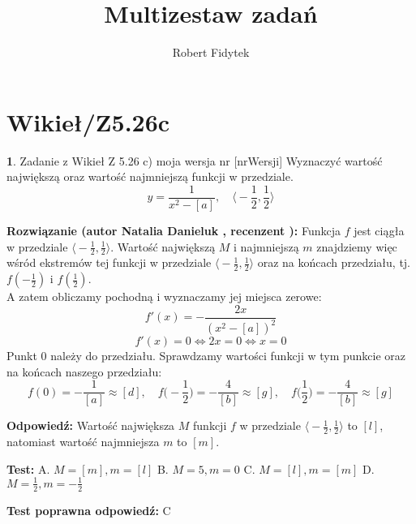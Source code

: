 \documentclass[12pt, a4paper]{article}
\title{Multizestaw zadań}
\author{Robert Fidytek}
\date{}
\theoremstyle{definition} %
\newtheorem{zad}{}
\newcommand{\kategoria}[1]{\section{#1}} %
\newcommand{\zadStart}[1]{\begin{zad}#1\newline} %
\newcommand{\zadStop}{\end{zad}}   %
\newcommand{\rozwStart}[2]{\noindent \textbf{Rozwiązanie (autor #1 , recenzent #2): }\newline} %
\newcommand{\rozwStop}{\newline}                                            %
\newcommand{\odpStart}{\noindent \textbf{Odpowiedź:}\newline}    %
\newcommand{\odpStop}{\newline}                                             %
\newcommand{\testStart}{\noindent \textbf{Test:}\newline} %
\newcommand{\testStop}{\newline} %
\newcommand{\kluczStart}{\noindent \textbf{Test poprawna odpowiedź:}\newline} %
\newcommand{\kluczStop}{\newline} %
\begin{document}
\maketitle

\kategoria{Wikieł/Z5.26c}

\zadStart{Zadanie z Wikieł Z 5.26 c) moja wersja nr [nrWersji]}
Wyznaczyć wartość największą oraz wartość najmniejszą funkcji w przedziale. 
$$y = \frac{1}{x^2-[a]}, \quad \big\langle-\frac{1}{2},\frac{1}{2}\big\rangle$$
\zadStop

\rozwStart{Natalia Danieluk}{}
Funkcja $f$ jest ciągła w przedziale $\big\langle-\frac{1}{2},\frac{1}{2}\big\rangle$. Wartość największą $M$ i najmniejszą $m$ znajdziemy więc wśród ekstremów tej funkcji w przedziale $\big\langle-\frac{1}{2},\frac{1}{2}\big\rangle$ oraz na końcach przedziału, tj. $f(-\frac{1}{2})$ i $f(\frac{1}{2})$. \\
A zatem obliczamy pochodną i wyznaczamy jej miejsca zerowe:
$$ f'(x) = -\frac{2 x}{(x^2-[a])^2} $$
$$ f'(x) = 0 \Leftrightarrow 2 x = 0 \Leftrightarrow x = 0 $$ 
Punkt $0$ należy do przedziału. Sprawdzamy wartości funkcji w tym punkcie oraz na końcach naszego przedziału: \\
$$ f(0) = -\frac{1}{[a]}\approx [d],\quad f\big(-\frac{1}{2}\big) = -\frac{4}{[b]} \approx [g],\quad f\big(\frac{1}{2}\big) = -\frac{4}{[b]} \approx [g] $$
\rozwStop

\odpStart
Wartość największa $M$ funkcji $f$ w przedziale $\big\langle-\frac{1}{2},\frac{1}{2}\big\rangle$ to $[l]$, natomiast wartość najmniejsza $m$ to $[m]$.
\odpStop

\testStart
A. $M=[m], m=[l]$
B. $M=5, m=0$
C. $M=[l], m=[m]$
D. $M=\frac{1}{2}, m=-\frac{1}{2}$
\testStop

\kluczStart
C
\kluczStop
\end{document}
